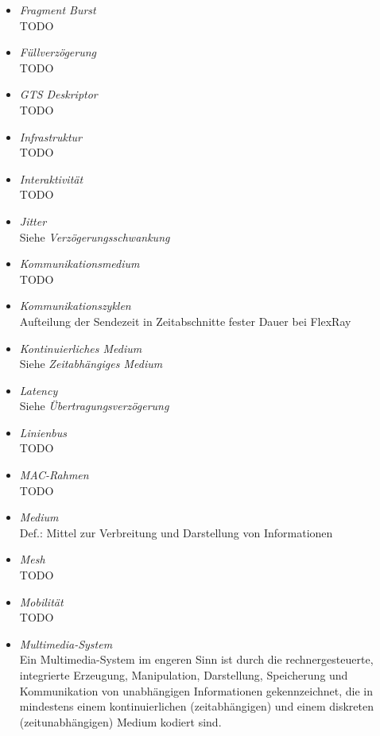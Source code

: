 \documentclass{article}
\begin{document}
\begin{itemize}
	\item \emph{Fragment Burst}\\
		TODO

	\item \emph{Füllverzögerung}\\
		TODO

	\item \emph{GTS Deskriptor}\\
		TODO

	\item \emph{Infrastruktur}\\
		TODO

	\item \emph{Interaktivität}\\
		TODO

	\item \emph{Jitter}\\
		Siehe \emph{Verzögerungsschwankung}

	\item \emph{Kommunikationsmedium}\\
		TODO

	\item \emph{Kommunikationszyklen}\\
		Aufteilung der Sendezeit in Zeitabschnitte fester Dauer bei FlexRay
	
	\item \emph{Kontinuierliches Medium}\\
		Siehe \emph{Zeitabhängiges Medium}

	\item \emph{Latency}\\
		Siehe \emph{Übertragungsverzögerung}

	\item \emph{Linienbus}\\
		TODO

	\item \emph{MAC-Rahmen}\\
		TODO

	\item \emph{Medium}\\
		Def.: Mittel zur Verbreitung und Darstellung von Informationen

	\item \emph{Mesh}\\
		TODO

	\item \emph{Mobilität}\\
		TODO

	\item \emph{Multimedia-System}\\
		Ein Multimedia-System im engeren Sinn ist durch die rechnergesteuerte, integrierte Erzeugung, Manipulation, Darstellung, Speicherung und Kommunikation von unabhängigen Informationen gekennzeichnet, die in mindestens einem kontinuierlichen (zeitabhängigen) und einem diskreten (zeitunabhängigen) Medium kodiert sind.


\end{itemize}
\end{document}

